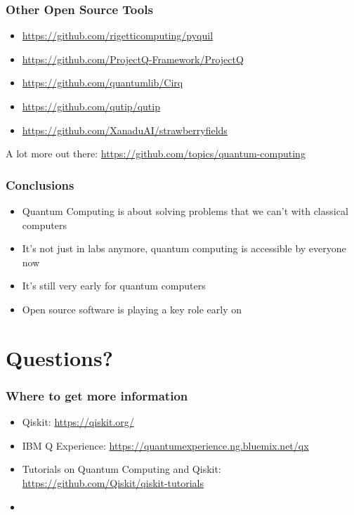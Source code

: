 \documentclass[aspectratio=169,11pt,hyperref={colorlinks=true}]{beamer}
\begin{document}
\begin{frame}
    \frametitle{Other Open Source Tools}
    \begin{itemize}
        \item \href{https://github.com/rigetticomputing/pyquil}{https://github.com/rigetticomputing/pyquil}
        \item \href{https://github.com/ProjectQ-Framework/ProjectQ}{https://github.com/ProjectQ-Framework/ProjectQ}
        \item \href{https://github.com/quantumlib/Cirq}{https://github.com/quantumlib/Cirq}
        \item \href{https://github.com/qutip/qutip}{https://github.com/qutip/qutip}
        \item \href{https://github.com/XanaduAI/strawberryfields}{https://github.com/XanaduAI/strawberryfields}
    \end{itemize}
    A lot more out there:
    \href{https://github.com/topics/quantum-computing}{https://github.com/topics/quantum-computing}
\end{frame}

\begin{frame}
    \frametitle{Conclusions}
    \begin{itemize}
        \item Quantum Computing is about solving problems that we can't with
            classical computers
        \item It's not just in labs anymore, quantum computing is accessible by
            everyone now
        \item It's still very early for quantum computers
        \item Open source software is playing a key role early on
    \end{itemize}
\end{frame}

\section{Questions?}
\begin{frame}
\frametitle{Where to get more information}
    \begin{itemize}
        \item Qiskit: \href{https://qiskit.org/}{https://qiskit.org/}
        \item IBM Q Experience: \href{https://quantumexperience.ng.bluemix.net/qx}{https://quantumexperience.ng.bluemix.net/qx}
        \item Tutorials on Quantum Computing and Qiskit: \href{https://github.com/Qiskit/qiskit-tutorials}{https://github.com/Qiskit/qiskit-tutorials}
        \item 
    \end{itemize}
\end{frame}
\end{document}
